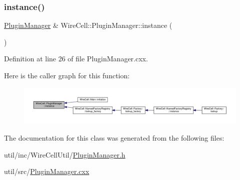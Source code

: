 \subsubsection{\texorpdfstring{instance()}{instance()}}
{\footnotesize\ttfamily \hyperlink{class_wire_cell_1_1_plugin_manager}{Plugin\+Manager} \& Wire\+Cell\+::\+Plugin\+Manager\+::instance (\begin{DoxyParamCaption}{ }\end{DoxyParamCaption})\hspace{0.3cm}{\ttfamily [static]}}



Definition at line 26 of file Plugin\+Manager.\+cxx.

Here is the caller graph for this function\+:
\nopagebreak
\begin{figure}[H]
\begin{center}
\leavevmode
\includegraphics[width=350pt]{class_wire_cell_1_1_plugin_manager_aa1a081d67e99b8ef796b879e450fc8e0_icgraph}
\end{center}
\end{figure}


The documentation for this class was generated from the following files\+:\begin{DoxyCompactItemize}
\item 
util/inc/\+Wire\+Cell\+Util/\hyperlink{_plugin_manager_8h}{Plugin\+Manager.\+h}\item 
util/src/\hyperlink{_plugin_manager_8cxx}{Plugin\+Manager.\+cxx}\end{DoxyCompactItemize}
